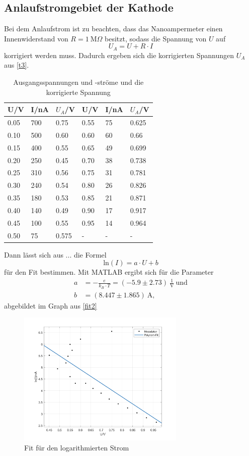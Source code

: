  \subsection{Anlaufstromgebiet der Kathode}
 Bei dem Anlaufstrom ist zu beachten, dass das Nanoampermeter einen Innenwiderstand von $R=1\ \textrm{M}\Omega$ besitzt, sodass die Spannung von $U$ auf
 \begin{equation*}
   U_{A}=U+R\cdot I
 \end{equation*}
 korrigiert werden muss. Dadurch ergeben sich die korrigierten Spannungen $U_{A}$ aus \autoref{t3}.
 \begin{table}[H]
 \centering
 \caption{Ausgangsspannungen und -ströme und die korrigierte Spannung}
 \begin{tabular}{l|l|l|l|l|l}
 U/V & I/nA & $U_{A}$/V & U/V & I/nA & $U_{A}$/V\\\hline
 0.05 & 700 & 0.75 & 0.55 & 75 & 0.625\\
 0.10 & 500 & 0.60 & 0.60 & 60 & 0.66\\
 0.15 & 400 & 0.55 & 0.65 & 49 & 0.699\\
 0.20 & 250 & 0.45 & 0.70 & 38 & 0.738\\
 0.25 & 310 & 0.56 & 0.75 & 31 & 0.781\\
 0.30 & 240 & 0.54 & 0.80 & 26 & 0.826\\
 0.35 & 180 & 0.53 & 0.85 & 21 & 0.871\\
 0.40 & 140 & 0.49 & 0.90 & 17 & 0.917\\
 0.45 & 100 & 0.55 & 0.95 & 14 & 0.964\\
 0.50 & 75 & 0.575 & - & - & -\\\hline
 \end{tabular}
 \label{t3}
 \end{table}
 Dann lässt sich aus ... die Formel 
 \begin{equation*}
   \textrm{ln}(I)=a\cdot U+b
 \end{equation*}
 für den Fit bestimmen. Mit MATLAB ergibt sich für die Parameter
 \begin{align*}
   a&=-\frac{e}{k_{B}\cdot T}=(-5.9 \pm 2.73)\ \frac{1}{\textrm{V}}\ \textrm{und}\\
   b&=(8.447 \pm 1.865)\ \textrm{A},
 \end{align*}
 abgebildet im Graph aus \autoref{fit2}
 \begin{figure}[H]
 \centering
 \includegraphics[width=8cm]{content/linfit.png}
 \caption{Fit für den logarithmierten Strom}
 \label{fit2}
 \end{figure}
